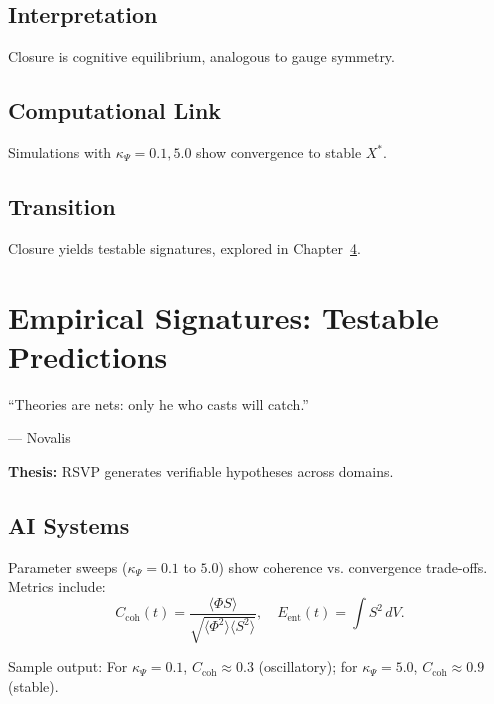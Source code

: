 \documentclass[12pt]{book}
\theoremstyle{definition}
\begin{document}
\section{Interpretation}
Closure is cognitive equilibrium, analogous to gauge symmetry.

\section{Computational Link}
Simulations with \(\kappa_\Psi = 0.1, 5.0\) show convergence to stable \(X^*\).

\section{Transition}
Closure yields testable signatures, explored in Chapter~\ref{chap:empirical}.

\chapter{Empirical Signatures: Testable Predictions}
\label{chap:empirical}
\epigraph{``Theories are nets: only he who casts will catch.''}{--- Novalis}

\textbf{Thesis:} RSVP generates verifiable hypotheses across domains.

\section{AI Systems}
Parameter sweeps (\(\kappa_\Psi = 0.1\) to \(5.0\)) show coherence vs. convergence trade-offs. Metrics include:
\begin{equation}
C_{\text{coh}}(t) = \frac{\langle \Phi S \rangle}{\sqrt{\langle \Phi^2 \rangle \langle S^2 \rangle}}, \quad E_{\text{ent}}(t) = \int S^2 \, dV.
\end{equation}

Sample output: For \(\kappa_\Psi = 0.1\), \(C_{\text{coh}} \approx 0.3\) (oscillatory); for \(\kappa_\Psi = 5.0\), \(C_{\text{coh}} \approx 0.9\) (stable).

\end{document}
